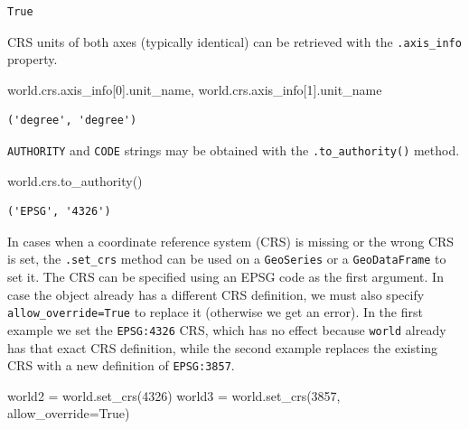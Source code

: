 \documentclass[
  letterpaper,
]{krantz}
\newenvironment{Shaded}{\begin{snugshade}}{\end{snugshade}}
\newcommand{\DecValTok}[1]{\textcolor[rgb]{0.68,0.00,0.00}{#1}}
\newcommand{\NormalTok}[1]{\textcolor[rgb]{0.00,0.23,0.31}{#1}}
\newcommand{\OperatorTok}[1]{\textcolor[rgb]{0.37,0.37,0.37}{#1}}
\newcommand{\VariableTok}[1]{\textcolor[rgb]{0.07,0.07,0.07}{#1}}
\begin{document}
\begin{verbatim}
True
\end{verbatim}

CRS units of both axes (typically identical) can be retrieved with the
\texttt{.axis\_info} property.

\begin{Shaded}
\begin{Highlighting}[]
\NormalTok{world.crs.axis\_info[}\DecValTok{0}\NormalTok{].unit\_name, world.crs.axis\_info[}\DecValTok{1}\NormalTok{].unit\_name}
\end{Highlighting}
\end{Shaded}

\begin{verbatim}
('degree', 'degree')
\end{verbatim}

\texttt{AUTHORITY} and \texttt{CODE} strings may be obtained with the
\texttt{.to\_authority()} method.

\begin{Shaded}
\begin{Highlighting}[]
\NormalTok{world.crs.to\_authority()}
\end{Highlighting}
\end{Shaded}

\begin{verbatim}
('EPSG', '4326')
\end{verbatim}

In cases when a coordinate reference system (CRS) is missing or the
wrong CRS is set, the \texttt{.set\_crs} method can be used on a
\texttt{GeoSeries} or a \texttt{GeoDataFrame} to set it. The CRS can be
specified using an EPSG code as the first argument. In case the object
already has a different CRS definition, we must also specify
\texttt{allow\_override=True} to replace it (otherwise we get an error).
In the first example we set the \texttt{EPSG:4326} CRS, which has no
effect because \texttt{world} already has that exact CRS definition,
while the second example replaces the existing CRS with a new definition
of \texttt{EPSG:3857}.

\begin{Shaded}
\begin{Highlighting}[]
\NormalTok{world2 }\OperatorTok{=}\NormalTok{ world.set\_crs(}\DecValTok{4326}\NormalTok{)}
\NormalTok{world3 }\OperatorTok{=}\NormalTok{ world.set\_crs(}\DecValTok{3857}\NormalTok{, allow\_override}\OperatorTok{=}\VariableTok{True}\NormalTok{)}
\end{Highlighting}
\end{Shaded}
\end{document}
